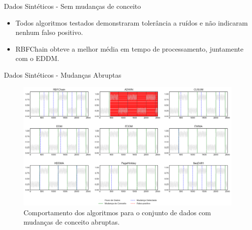 \documentclass[10pt]{beamer}
\begin{document}
\begin{frame}{Dados Sintéticos -  Sem mudanças de conceito}
    \begin{itemize}
        \item Todos algoritmos testados demonstraram tolerância a ruídos e não indicaram nenhum falso positivo.
        \item RBFChain obteve a melhor média em tempo de processamento, juntamente com o EDDM.
    \end{itemize}
\end{frame}

\begin{frame}{Dados Sintéticos -  Mudanças Abruptas}
    \begin{figure}[t]
        \begin{center}
            \includegraphics[width=\textwidth]{imagens/abrupt.png}
            \caption{Comportamento dos algoritmos para o conjunto de dados com mudanças de conceito abruptas.}
            \label{fig:exp_abrupta}
        \end{center}
    \end{figure}
\end{frame}
\end{document}

